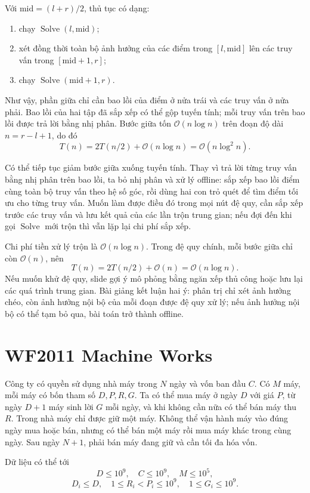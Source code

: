 \documentclass[11pt]{article}
\newcommand{\Oh}{\mathcal{O}}
\newcommand{\midp}{\mathrm{mid}}
\newcommand{\Solve}{\operatorname{Solve}}
\begin{document}
Với \(\midp=(l+r)/2\), thủ tục có dạng:
\begin{enumerate}
  \item chạy \(\Solve(l,\midp)\);
  \item xét đồng thời toàn bộ ảnh hưởng của các điểm trong \([l,\midp]\)
  lên các truy vấn trong \([\midp+1,r]\);
  \item chạy \(\Solve(\midp+1,r)\).
\end{enumerate}
Như vậy, phần giữa chỉ cần bao lồi của điểm ở nửa trái và các truy vấn ở nửa
phải. Bao lồi của hai tập đã sắp xếp có thể gộp tuyến tính; mỗi truy vấn trên
bao lồi được trả lời bằng nhị phân. Bước giữa tốn \(\Oh(n\log n)\) trên đoạn
độ dài \(n=r-l+1\), do đó
\[
  T(n)=2T(n/2)+\Oh(n\log n)=\Oh(n\log^2 n).
\]

Có thể tiếp tục giảm bước giữa xuống tuyến tính. Thay vì trả lời từng truy
vấn bằng nhị phân trên bao lồi, ta bỏ nhị phân và xử lý offline: sắp xếp bao
lồi điểm cùng toàn bộ truy vấn theo hệ số góc, rồi dùng hai con trỏ quét để
tìm điểm tối ưu cho từng truy vấn. Muốn làm được điều đó trong mọi nút đệ quy,
cần sắp xếp trước các truy vấn và lưu kết quả của các lần trộn trung gian; nếu
đợi đến khi gọi \(\Solve\) mới trộn thì vẫn lặp lại chi phí sắp xếp.

Chi phí tiền xử lý trộn là \(\Oh(n\log n)\). Trong đệ quy chính, mỗi bước giữa
chỉ còn \(\Oh(n)\), nên
\[
  T(n)=2T(n/2)+\Oh(n)=\Oh(n\log n).
\]
Nếu muốn khử đệ quy, slide gợi ý mô phỏng bằng ngăn xếp thủ công hoặc lưu lại
các quá trình trung gian. Bài giảng kết luận hai ý: phân trị chỉ xét ảnh hưởng
chéo, còn ảnh hưởng nội bộ của mỗi đoạn được đệ quy xử lý; nếu ảnh hưởng nội
bộ có thể tạm bỏ qua, bài toán trở thành offline.

\section{WF2011 Machine Works}

Công ty có quyền sử dụng nhà máy trong \(N\) ngày và vốn ban đầu \(C\). Có
\(M\) máy, mỗi máy có bốn tham số \(D,P,R,G\). Ta có thể mua máy ở ngày
\(D\) với giá \(P\), từ ngày \(D+1\) máy sinh lời \(G\) mỗi ngày, và khi
không cần nữa có thể bán máy thu \(R\). Trong nhà máy chỉ được giữ một máy.
Không thể vận hành máy vào đúng ngày mua hoặc bán, nhưng có thể bán một máy
rồi mua máy khác trong cùng ngày. Sau ngày \(N+1\), phải bán máy đang giữ và
cần tối đa hóa vốn.

Dữ liệu có thể tới
\[
  D\le 10^9,\quad C\le 10^9,\quad M\le 10^5,
\]
\[
  D_i\le D,\quad 1\le R_i<P_i\le 10^9,\quad 1\le G_i\le 10^9.
\]
\end{document}
